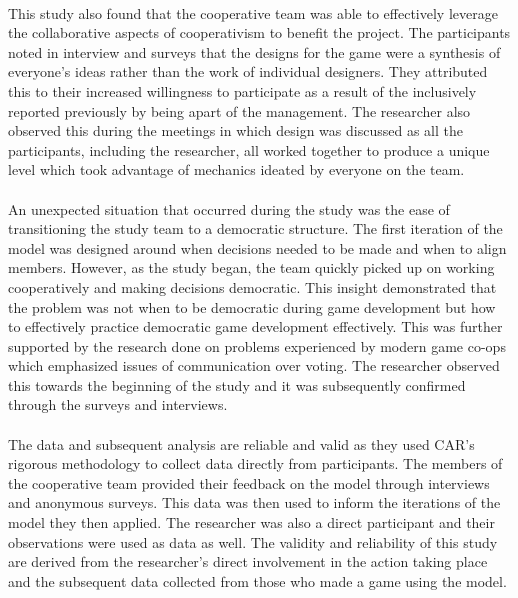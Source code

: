 \paragraph{} This study also found that the cooperative team was able to effectively leverage the collaborative aspects of cooperativism to benefit the project. The participants noted in interview and surveys that the designs for the game were a synthesis of everyone's ideas rather than the work of individual designers. They attributed this to their increased willingness to participate as a result of the inclusively reported previously by being apart of the management. The researcher also observed this during the meetings in which design was discussed as all the participants, including the researcher, all worked together to produce a unique level which took advantage of mechanics ideated by everyone on the team.

\paragraph{} An unexpected situation that occurred during the study was the ease of transitioning the study team to a democratic structure. The first iteration of the model was designed around when decisions needed to be made and when to align members. However, as the study began, the team quickly picked up on working cooperatively and making decisions democratic. This insight demonstrated that the problem was not when to be democratic during game development but how to effectively practice democratic game development effectively. This was further supported by the research done on problems experienced by modern game co-ops which emphasized issues of communication over voting. The researcher observed this towards the beginning of the study and it was subsequently confirmed through the surveys and interviews.

\paragraph{} The data and subsequent analysis are reliable and valid as they used CAR's rigorous methodology to collect data directly from participants. The members of the cooperative team provided their feedback on the model through interviews and anonymous surveys. This data was then used to inform the iterations of the model they then applied. The researcher was also a direct participant and their observations were used as data as well. The validity and reliability of this study are derived from the researcher's direct involvement in the action taking place and the subsequent data collected from those who made a game using the model.

